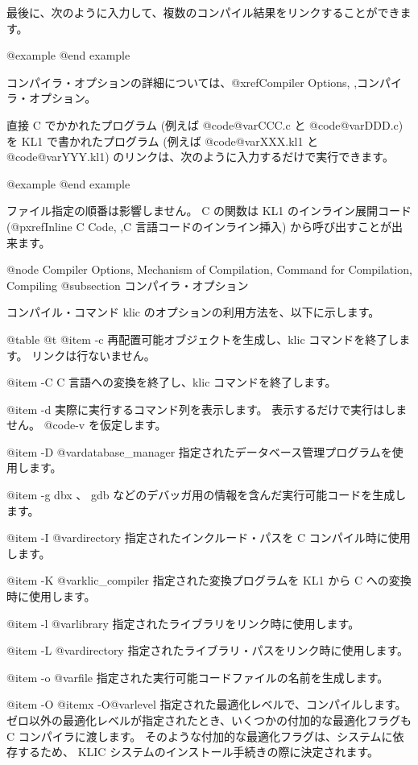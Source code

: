 {{{{最後に、次のように入力して、複数のコンパイル結果をリンクすることができます。

@example
@end example

コンパイラ・オプションの詳細については、@xref{Compiler Options, ,コンパイラ・オプション}。

直接 C でかかれたプログラム
(例えば @code{@var{CCC}.c} と @code{@var{DDD}.c})を
 KL1 で書かれたプログラム
(例えば @code{@var{XXX}.kl1} と @code{@var{YYY}.kl1})
のリンクは、次のように入力するだけで実行できます。

@example
@end example

ファイル指定の順番は影響しません。
 C の関数は KL1 のインライン展開コード
(@pxref{Inline C Code, ,C 言語コードのインライン挿入})
から呼び出すことが出来ます。

@node Compiler Options, Mechanism of Compilation, Command for Compilation, Compiling
@subsection コンパイラ・オプション

コンパイル・コマンド klic のオプションの利用方法を、以下に示します。

@table @t
@item -c
再配置可能オブジェクトを生成し、klic コマンドを終了します。
リンクは行ないません。

@item -C
 C 言語への変換を終了し、klic コマンドを終了します。

@item -d
実際に実行するコマンド列を表示します。
表示するだけで実行はしません。 @code{-v} を仮定します。

@item -D @var{database_manager}
指定されたデータベース管理プログラムを使用します。

@item -g
 dbx 、 gdb などのデバッガ用の情報を含んだ実行可能コードを生成します。

@item -I @var{directory}
指定されたインクルード・パスを C コンパイル時に使用します。

@item -K @var{klic_compiler}
指定された変換プログラムを KL1 から C への変換時に使用します。

@item -l @var{library}
指定されたライブラリをリンク時に使用します。

@item -L @var{directory}
指定されたライブラリ・パスをリンク時に使用します。

@item -o @var{file}
指定された実行可能コードファイルの名前を生成します。

@item -O
@itemx -O@var{level}
指定された最適化レベルで、コンパイルします。
ゼロ以外の最適化レベルが指定されたとき、いくつかの付加的な最適化フラグも C コンパイラに渡します。
そのような付加的な最適化フラグは、システムに依存するため、 KLIC システムのインストール手続きの際に決定されます。

}}}}
